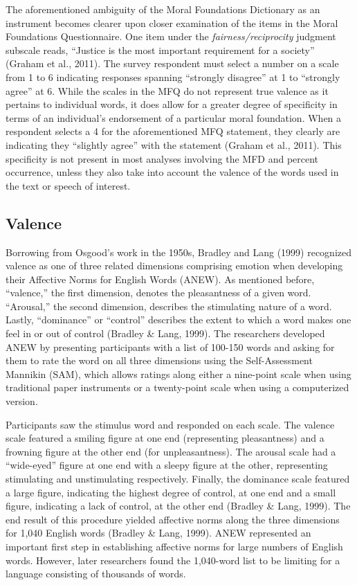\documentclass[english,,man]{apa6}
\begin{document}
The aforementioned ambiguity of the Moral Foundations Dictionary as an
instrument becomes clearer upon closer examination of the items in the
Moral Foundations Questionnaire. One item under the
\emph{fairness/reciprocity} judgment subscale reads, \enquote{Justice is
the most important requirement for a society} (Graham et al., 2011). The
survey respondent must select a number on a scale from 1 to 6 indicating
responses spanning \enquote{strongly disagree} at 1 to \enquote{strongly
agree} at 6. While the scales in the MFQ do not represent true valence
as it pertains to individual words, it does allow for a greater degree
of specificity in terms of an individual's endorsement of a particular
moral foundation. When a respondent selects a 4 for the aforementioned
MFQ statement, they clearly are indicating they \enquote{slightly agree}
with the statement (Graham et al., 2011). This specificity is not
present in most analyses involving the MFD and percent occurrence,
unless they also take into account the valence of the words used in the
text or speech of interest.

\subsection{Valence}\label{valence}

Borrowing from Osgood's work in the 1950s, Bradley and Lang (1999)
recognized valence as one of three related dimensions comprising emotion
when developing their Affective Norms for English Words (ANEW). As
mentioned before, \enquote{valence,} the first dimension, denotes the
pleasantness of a given word. \enquote{Arousal,} the second dimension,
describes the stimulating nature of a word. Lastly, \enquote{dominance}
or \enquote{control} describes the extent to which a word makes one feel
in or out of control (Bradley \& Lang, 1999). The researchers developed
ANEW by presenting participants with a list of 100-150 words and asking
for them to rate the word on all three dimensions using the
Self-Assessment Mannikin (SAM), which allows ratings along either a
nine-point scale when using traditional paper instruments or a
twenty-point scale when using a computerized version.

Participants saw the stimulus word and responded on each scale. The
valence scale featured a smiling figure at one end (representing
pleasantness) and a frowning figure at the other end (for
unpleasantness). The arousal scale had a \enquote{wide-eyed} figure at
one end with a sleepy figure at the other, representing stimulating and
unstimulating respectively. Finally, the dominance scale featured a
large figure, indicating the highest degree of control, at one end and a
small figure, indicating a lack of control, at the other end (Bradley \&
Lang, 1999). The end result of this procedure yielded affective norms
along the three dimensions for 1,040 English words (Bradley \& Lang,
1999). ANEW represented an important first step in establishing
affective norms for large numbers of English words. However, later
researchers found the 1,040-word list to be limiting for a language
consisting of thousands of words.
\end{document}
